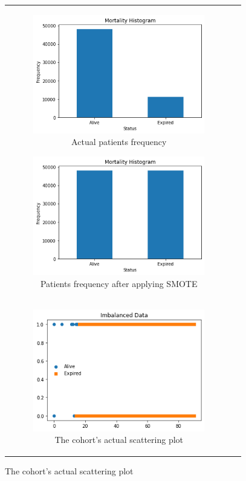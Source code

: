 \begin{figure}[H]
\begin{tabular}{@{}cc@{}}
\begin{subfigure}{0.5\textwidth}
  \centering
  \includegraphics[width=7.5cm]{fig/chapter4/Before SMOTE.png}
  \caption{\footnotesize{Actual patients frequency}}
  \label{fig:beforesmote}
\end{subfigure} 
\begin{subfigure}{0.5\textwidth}
  \centering
  \includegraphics[width=7.5cm]{fig/chapter4/After SMOTE.png}
  \caption{\footnotesize{Patients frequency after applying \acrshort{SMOTE}}}
  \label{fig:aftersmote}
\end{subfigure} \\
\begin{subfigure}{0.5\textwidth}
  \centering
  \includegraphics[width=7.5cm]{fig/chapter4/Imbalanced Data.png}
  \caption{\footnotesize{The cohort's actual scattering plot}}
  \label{fig:imbalanced}
\end{subfigure} 

\end{tabular}
\end{figure}
